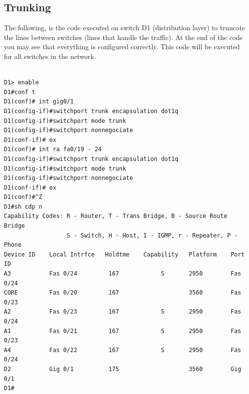 \documentclass[ a4, 12pt, onecolumn]{IEEEtran}
\begin{document}
\subsection{Trunking}
The following, is the code executed on switch D1 (distribution layer) to truncate the lines between switches (lines that handle the traffic). At the end of the code you may see that everything is configured correctly. This code will be executed for all switches in the network.
\begin{center}
\begin{lstlisting}

D1> enable
D1#conf t
D1(conf)# int gig0/1
D1(config-if)#switchport trunk encapsulation dot1q 
D1(config-if)#switchport mode trunk
D1(config-if)#switchport nonnegociate
D1(conf-if)# ex
D1(conf)# int ra fa0/19 - 24
D1(config-if)#switchport trunk encapsulation dot1q 
D1(config-if)#switchport mode trunk
D1(config-if)#switchport nonnegociate
D1(conf-if)# ex
D1(conf)#^Z
D1#sh cdp n
Capability Codes: R - Router, T - Trans Bridge, B - Source Route Bridge
                  S - Switch, H - Host, I - IGMP, r - Repeater, P - Phone
Device ID    Local Intrfce   Holdtme    Capability   Platform    Port ID
A3           Fas 0/24         167            S       2950        Fas 0/24
CORE         Fas 0/20         167                    3560        Fas 0/23
A2           Fas 0/23         167            S       2950        Fas 0/24
A1           Fas 0/21         167            S       2950        Fas 0/23
A4           Fas 0/22         167            S       2950        Fas 0/24
D2           Gig 0/1          175                    3560        Gig 0/1
D1#
\end{lstlisting}
\end{center}
\end{document}
